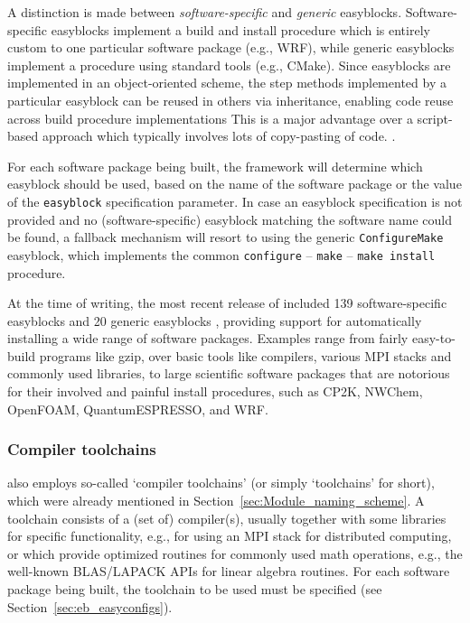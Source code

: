 A distinction is made between \emph{software-specific} and \emph{generic} easyblocks.
Software-specific easyblocks implement a build and install procedure which is
entirely custom to one particular software package (e.g., WRF), while
generic easyblocks implement a procedure using standard tools (e.g., CMake).
Since easyblocks are implemented in an object-oriented scheme,
the step methods implemented by a particular easyblock can be reused in others via
inheritance, enabling code reuse across build procedure implementations
This is a major advantage over a script-based approach which typically involves
lots of copy-pasting of code.
.

For each software package being built, the \easybuild{} framework will determine
which easyblock should be used, based on the name of the software package or the
value of the \texttt{\small easyblock} specification parameter. In case an easyblock
specification is not provided and no (software-specific) easyblock matching the
software name could be found, a fallback mechanism will resort to using the generic
\texttt{\small ConfigureMake} easyblock, which implements the common
\texttt{\small configure} -- \texttt{\small make} -- \texttt{\small make install}
procedure.

At the time of writing, the most recent release of \easybuild{} included 139
software-specific easyblocks and 20 generic easyblocks , providing support for
automatically installing a wide range of software packages. Examples range
from fairly easy-to-build programs like gzip, over basic  tools like
compilers, various MPI stacks and commonly used libraries, to large scientific
software packages that are notorious for their involved and painful install
procedures, such as CP2K, NWChem, OpenFOAM, QuantumESPRESSO, and WRF.

\subsubsection{Compiler toolchains}
\label{sec:eb_toolchains}

\easybuild{} also employs so-called `compiler toolchains' (or simply `toolchains'
for short), which were already mentioned in Section~\ref{sec:Module_naming_scheme}.
A toolchain consists of a (set of) compiler(s), usually together with some
libraries for specific functionality, e.g., for using an MPI stack for distributed
computing, or which provide optimized routines for commonly used math operations,
e.g., the well-known BLAS/LAPACK APIs for linear algebra routines. For each software
package being built, the toolchain to be used must be specified
(see Section~\ref{sec:eb_easyconfigs}).

